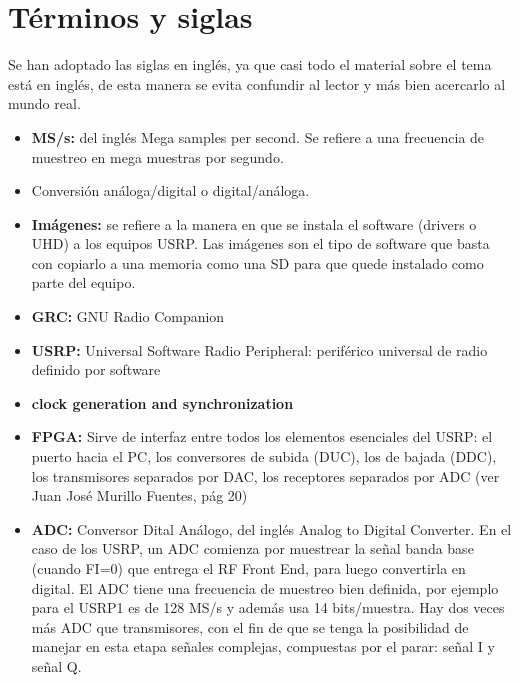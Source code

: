 \section{Términos y siglas}
Se han adoptado las siglas en inglés, ya que  casi todo el material sobre el tema está en inglés, de esta manera se evita confundir al lector y más bien acercarlo al mundo real.

\begin{itemize}
	\item  \textbf{MS/s:}  del inglés Mega samples per second. Se refiere a una frecuencia de muestreo en mega muestras por segundo. 
	\item   Conversión análoga/digital o digital/análoga.
	\item  \textbf{Imágenes:}  se refiere a la manera en que se instala el software (drivers o UHD) a los equipos USRP. Las imágenes son el tipo de software que basta con copiarlo a una memoria como una SD para que quede instalado como parte del equipo.
	\item   \textbf{GRC:} GNU Radio Companion 
	\item   \textbf{USRP:} Universal Software Radio Peripheral: periférico universal de radio definido por software
	\item  \textbf{clock generation and synchronization}
	\item  \textbf{FPGA:} Sirve de interfaz entre todos los elementos esenciales del USRP: el puerto hacia el PC, los conversores de subida (DUC), los de bajada (DDC), los transmisores separados por DAC, los receptores separados por ADC (ver Juan José Murillo Fuentes, pág 20)
	\item  \textbf{ADC:} Conversor Dital Análogo, del inglés Analog to Digital Converter. En el caso de los USRP, un ADC comienza por  muestrear la señal banda base (cuando FI=0) que entrega el RF Front End, para luego convertirla en digital. El ADC tiene una frecuencia de muestreo bien definida, por ejemplo para el USRP1 es de 128 MS/s y además usa 14 bits/muestra. Hay dos veces más ADC que transmisores, con el fin de que se tenga la posibilidad de manejar en esta etapa señales complejas, compuestas por el parar: señal I y señal Q.  
	

\end{itemize}

